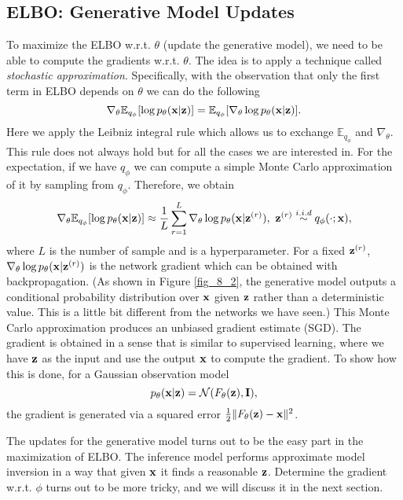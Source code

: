 \documentclass[../main.tex]{subfiles}
\begin{document}
\subsection{ELBO: Generative Model Updates}
To maximize the ELBO w.r.t. $\theta$ (update the generative model), we need to be able to compute the gradients w.r.t. $\theta$. The idea is to apply a technique called \emph{stochastic approximation}. Specifically, with the observation that only the first term in ELBO depends on $\theta$ we can do the following
\begin{equation*}
\nabla_{\theta}\mathbb{E}_{q_{\phi}}[\log p_\theta({\bf x}|{\bf z})] = \mathbb{E}_{q_{\phi}}[\nabla_{\theta}\log p_\theta({\bf x}|{\bf z})].
\end{equation*}
Here we apply the Leibniz integral rule which allows us to exchange $\mathbb{E}_{q_\phi}$ and $\nabla_{\theta}$. This rule does not always hold but for all the cases we are interested in. For the expectation, if we have $q_\phi$ we can compute a simple Monte Carlo approximation of it by sampling from $q_\phi$. Therefore, we obtain
\begin{equation*}
\nabla_{\theta}\mathbb{E}_{q_{\phi}}[\log p_\theta({\bf x}|{\bf z})] \approx \frac{1}{L}\sum_{r=1}^{L} \nabla_{\theta}\log p_\theta({\bf x}|{\bf z}^{(r)}),\ {\bf z}^{(r)}\overset{i.i.d}{\sim}q_\phi(\cdot;{\bf x}),
\end{equation*}
where $L$ is the number of sample and is a hyperparameter. For a fixed ${\bf z}^{(r)}$, $\nabla_{\theta}\log p_\theta({\bf x}|{\bf z}^{(r)})$ is the network gradient which can be obtained with backpropagation. (As shown in Figure \ref{fig_8_2}, the generative model outputs a conditional probability distribution over ${\bf x}$ given ${\bf z}$ rather than a deterministic value. This is a little bit different from the networks we have seen.) This Monte Carlo approximation produces an unbiased gradient estimate (SGD). The gradient is obtained in a sense that is similar to supervised learning, where we have ${\bf z}$ as the input and use the output ${\bf x}$ to compute the gradient. To show how this is done, for a Gaussian observation model
\begin{equation}\label{eq_8_gau_obs}
p_\theta({\bf x}|{\bf z})=\mathcal{N}(F_\theta({\bf z}), {\bf I}),
\end{equation}
the gradient is generated via a squared error $\frac{1}{2}\|F_\theta({\bf z})-{\bf x}\|^2$.
\par The updates for the generative model turns out to be the easy part in the maximization of ELBO. The inference model performs approximate model inversion in a way that given ${\bf x}$ it finds a reasonable ${\bf z}$. Determine the gradient w.r.t. $\phi$ turns out to be more tricky, and we will discuss it in the next section.
\end{document}
